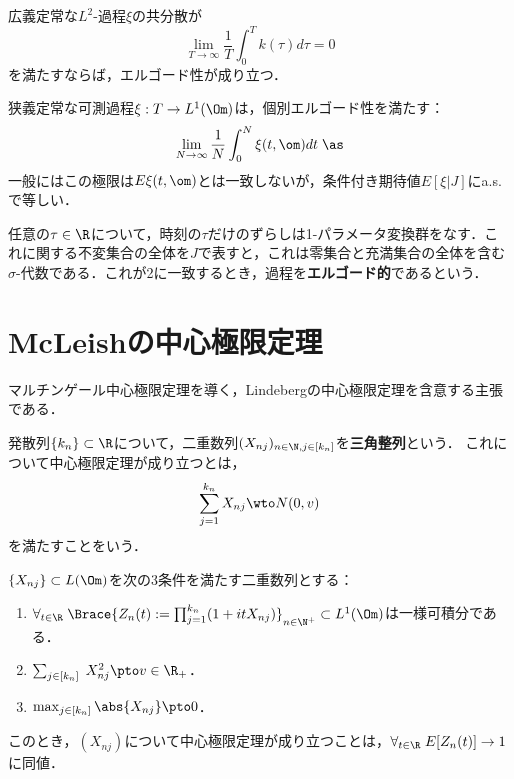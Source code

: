 \documentclass[uplatex,dvipdfmx]{jsreport}
\begin{document}
\begin{theorem}
    広義定常な$L^2$-過程$\xi$の共分散が
    \[\lim_{T\to\infty}\frac{1}{T}\int^T_0k(\tau)d\tau=0\]
    を満たすならば，エルゴード性が成り立つ．
\end{theorem}

\begin{theorem}
    狭義定常な可測過程$\xi:T\to L^1(\Om)$は，個別エルゴード性を満たす：
    \[\lim_{N\to\infty}\frac{1}{N}\int^N_0\xi(t,\om)dt\;\as\]
    一般にはこの極限は$E{\xi(t,\om)}$とは一致しないが，条件付き期待値$E[\xi|J]$にa.s.で等しい．
\end{theorem}

\begin{definition}
    任意の$\tau\in\R$について，時刻の$\tau$だけのずらしは1-パラメータ変換群をなす．これに関する不変集合の全体を$J$で表すと，これは零集合と充満集合の全体を含む$\sigma$-代数である．これが2に一致するとき，過程を\textbf{エルゴード的}であるという．
\end{definition}

\section{McLeishの中心極限定理}

\begin{tcolorbox}[colframe=ForestGreen, colback=ForestGreen!10!white,breakable,colbacktitle=ForestGreen!40!white,coltitle=black,fonttitle=\bfseries\sffamily,
title=]
    マルチンゲール中心極限定理を導く，Lindebergの中心極限定理を含意する主張である．
\end{tcolorbox}

\begin{definition}
    発散列$\{k_n\}\subset\R$について，二重数列$(X_{nj})_{n\in\N,j\in[k_n]}$を\textbf{三角整列}という．
    これについて中心極限定理が成り立つとは，
    \[\sum_{j=1}^{k_n}X_{nj}\wto N(0,v)\]
    を満たすことをいう．
\end{definition}

\begin{theorem}[McLeish]
    $\{X_{nj}\}\subset L(\Om)$を次の3条件を満たす二重数列とする：
    \begin{enumerate}[({M}1)]
        \item $\forall_{t\in\R}\;\Brace{Z_n(t):=\prod_{j=1}^{k_n}(1+itX_{nj})}_{n\in\N^+}\subset L^1(\Om)$は一様可積分である．
        \item $\sum_{j\in[k_n]}\;X_{nj}^2\pto v\in\R_+$．
        \item $\max_{j\in[k_n]}\abs{X_{nj}}\pto 0$．
    \end{enumerate}
    このとき，$(X_{nj})$について中心極限定理が成り立つことは，$\forall_{t\in\R}\;E[Z_n(t)]\to1$に同値．
\end{theorem}
\end{document}
